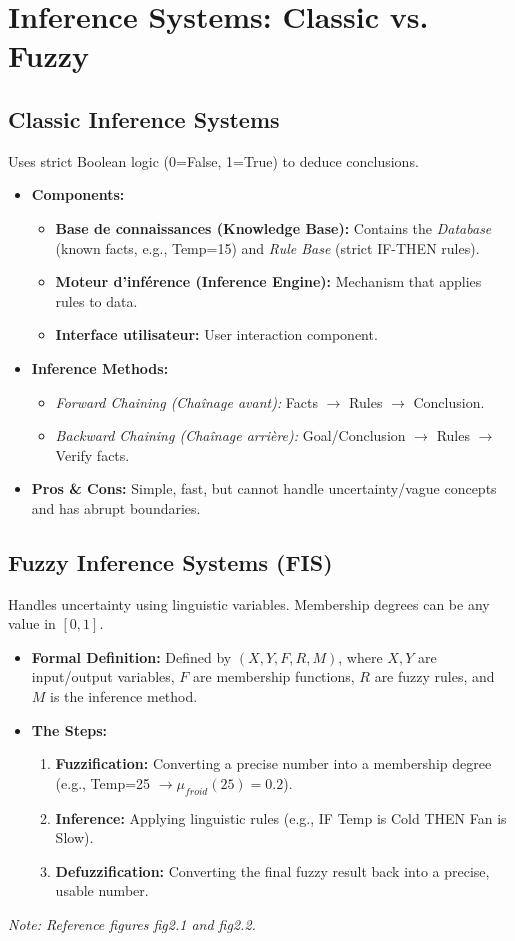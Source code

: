 \documentclass[11pt,a4paper]{article}
\begin{document}
\newpage
\section{Inference Systems: Classic vs. Fuzzy}

\subsection{Classic Inference Systems}
Uses strict Boolean logic (0=False, 1=True) to deduce conclusions.
\begin{itemize}
    \item \textbf{Components:}
    \begin{itemize}
        \item \textbf{Base de connaissances (Knowledge Base):} Contains the \textit{Database} (known facts, e.g., Temp=15) and \textit{Rule Base} (strict IF-THEN rules).
        \item \textbf{Moteur d'inférence (Inference Engine):} Mechanism that applies rules to data.
        \item \textbf{Interface utilisateur:} User interaction component.
    \end{itemize}
    \item \textbf{Inference Methods:}
    \begin{itemize}
        \item \textit{Forward Chaining (Chaînage avant):} Facts $\rightarrow$ Rules $\rightarrow$ Conclusion.
        \item \textit{Backward Chaining (Chaînage arrière):} Goal/Conclusion $\rightarrow$ Rules $\rightarrow$ Verify facts.
    \end{itemize}
    \item \textbf{Pros \& Cons:} Simple, fast, but cannot handle uncertainty/vague concepts and has abrupt boundaries.
\end{itemize}

\subsection{Fuzzy Inference Systems (FIS)}
Handles uncertainty using linguistic variables. Membership degrees can be any value in $[0, 1]$.
\begin{itemize}
    \item \textbf{Formal Definition:} Defined by $(X, Y, F, R, M)$, where $X, Y$ are input/output variables, $F$ are membership functions, $R$ are fuzzy rules, and $M$ is the inference method.
    \item \textbf{The Steps:}
    \begin{enumerate}
        \item \textbf{Fuzzification:} Converting a precise number into a membership degree (e.g., Temp=25 $\rightarrow \mu_{froid}(25)=0.2$).
        \item \textbf{Inference:} Applying linguistic rules (e.g., IF Temp is Cold THEN Fan is Slow).
        \item \textbf{Defuzzification:} Converting the final fuzzy result back into a precise, usable number.
    \end{enumerate}
\end{itemize}
\textit{Note: Reference figures fig2.1 and fig2.2.}
\end{document}

